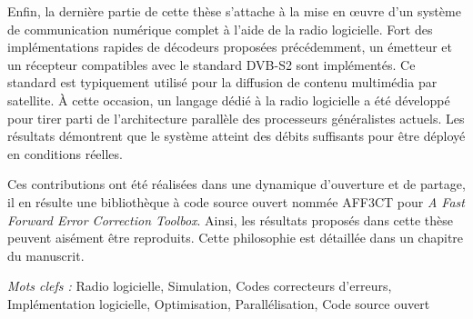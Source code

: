 Enfin, la dernière partie de cette thèse s'attache à la mise en œuvre d'un
système de communication numérique complet à l'aide de la radio logicielle. Fort
des implémentations rapides de décodeurs proposées précédemment, un émetteur et
un récepteur compatibles avec le standard DVB-S2 sont implémentés. Ce standard
est typiquement utilisé pour la diffusion de contenu multimédia par satellite. À
cette occasion, un langage dédié à la radio logicielle a été développé pour
tirer parti de l'architecture parallèle des processeurs généralistes actuels.
Les résultats démontrent que le système atteint des débits suffisants pour être
déployé en conditions réelles.

Ces contributions ont été réalisées dans une dynamique d'ouverture et de
partage, il en résulte une bibliothèque à code source ouvert nommée AFF3CT pour
\emph{A Fast Forward Error Correction Toolbox}. Ainsi, les résultats proposés
dans cette thèse peuvent aisément être reproduits. Cette philosophie est
détaillée dans un chapitre du manuscrit.

\vskip0.5cm
\emph{Mots clefs :} Radio logicielle, Simulation, Codes correcteurs d'erreurs,
                    Implémentation logicielle, Optimisation, Parallélisation,
                    Code source ouvert
